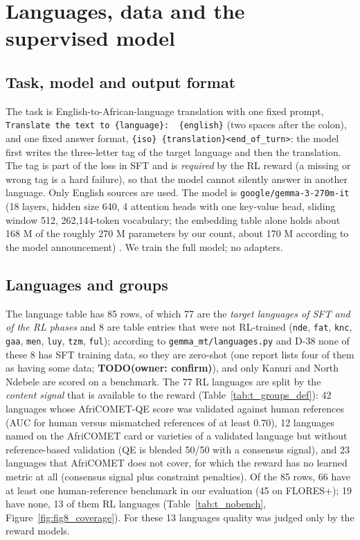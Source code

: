 \section{Languages, data and the supervised model}\label{languages-data-and-the-supervised-model}

\subsection{Task, model and output format}\label{task-model-and-output-format}

The task is English-to-African-language translation with one fixed prompt, \texttt{Translate\ the\ text\ to\ \{language\}:\ \ \{english\}} (two spaces after the colon), and one fixed answer format, \texttt{\{iso\}\ \{translation\}\textless{}end\_of\_turn\textgreater{}}: the model first writes the three-letter tag of the target language and then the translation. The tag is part of the loss in SFT and is \emph{required} by the RL reward (a missing or wrong tag is a hard failure), so that the model cannot silently answer in another language. Only English sources are used. The model is \texttt{google/gemma-3-270m-it} (18 layers, hidden size 640, 4 attention heads with one key-value head, sliding window 512, 262,144-token vocabulary; the embedding table alone holds about 168 M of the roughly 270 M parameters by our count, about 170 M according to the model announcement) \citep{gemmateam2025gemma3, google2025gemma270m}. We train the full model; no adapters.

\subsection{Languages and groups}\label{languages-and-groups}

The language table has 85 rows, of which 77 are the \emph{target languages of SFT and of the RL phases} and 8 are table entries that were not RL-trained (\texttt{nde}, \texttt{fat}, \texttt{knc}, \texttt{gaa}, \texttt{men}, \texttt{luy}, \texttt{tzm}, \texttt{ful}); according to \texttt{gemma\_mt/languages.py} and D-38 none of these 8 has SFT training data, so they are zero-shot (one report lists four of them as having some data; {\color{red}\textbf{TODO(owner: confirm)}}), and only Kanuri and North Ndebele are scored on a benchmark. The 77 RL languages are split by the \emph{content signal} that is available to the reward (Table~\ref{tab:t_groups_def}): 42 languages whose AfriCOMET-QE score was validated against human references (AUC for human versus mismatched references of at least 0.70), 12 languages named on the AfriCOMET card or varieties of a validated language but without reference-based validation (QE is blended 50/50 with a consensus signal), and 23 languages that AfriCOMET does not cover, for which the reward has no learned metric at all (consensus signal plus constraint penalties). Of the 85 rows, 66 have at least one human-reference benchmark in our evaluation (45 on FLORES+); 19 have none, 13 of them RL languages (Table~\ref{tab:t_nobench}, Figure~\ref{fig:fig8_coverage}). For these 13 languages quality was judged only by the reward models.

